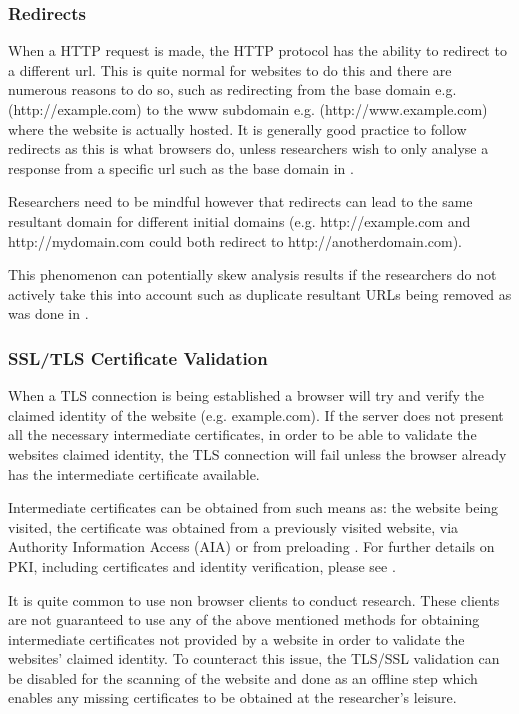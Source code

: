 \documentclass{mscreport}
\begin{document}
\subsubsection{Redirects}

When a HTTP request is made, the HTTP protocol has the ability to redirect to a different url. This is quite normal for websites to do this and there are numerous reasons to do so, such as redirecting from the base domain e.g. (http://example.com) to the www subdomain e.g. (http://www.example.com) where the website is actually hosted. It is generally good practice to follow redirects as this is what browsers do, unless researchers wish to only analyse a response from a specific url such as the base domain in \cite{Amann2017-co}.

\vspace{0.3cm} \noindent
Researchers need to be mindful however that redirects can lead to the same resultant domain for different initial domains (e.g. http://example.com and http://mydomain.com could both redirect to http://anotherdomain.com).

\vspace{0.3cm} \noindent
This phenomenon can potentially skew analysis results if the researchers do not actively take this into account such as duplicate resultant URLs being removed as was done in \cite{Lavrenovs2018-dl}.

\subsubsection{SSL/TLS Certificate Validation}

When a TLS connection is being established a browser will try and verify the claimed identity of the website (e.g. example.com). If the server does not present all the necessary intermediate certificates, in order to be able to validate the websites claimed identity, the TLS connection will fail unless the browser already has the intermediate certificate available.

\vspace{0.3cm} \noindent
Intermediate certificates can be obtained from such means as: the website being visited, the certificate was obtained from a previously visited website, via Authority Information Access (AIA) \cite{Cooper2008-yr} or from preloading \cite{Keeler2020-yj}. For further details on PKI, including certificates and identity verification, please see \cite{Clark2013-sh,Holz2011-yv}.

\vspace{0.3cm} \noindent
It is quite common to use non browser clients to conduct research. These clients are not guaranteed to use any of the above mentioned methods for obtaining intermediate certificates not provided by a website in order to validate the websites' claimed identity. To counteract this issue, the TLS/SSL validation can be disabled for the scanning of the website and done as an offline step which enables any missing certificates to be obtained at the researcher's leisure.
\end{document}
